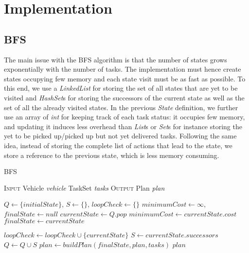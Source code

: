 \documentclass[10pt]{article}
\begin{document}
\section{Implementation}

\subsection{BFS}
The main issue with the BFS algorithm is that the number of states grows exponentially with the number of tasks.
The implementation must hence create states occupying few memory and each state visit must be as fast as possible.
To this end, we use a \textit{LinkedList} for storing the set of all states that are yet to be visited and \textit{HashSet}s for storing the successors of the current state as well as the set of all the already visited states.
In the previous \textit{State} definition, we further use an array of \textit{int} for keeping track of each task status: it occupies few memory, and updating it induces less overhead than \textit{List}s or \textit{Set}s for instance storing the yet to be picked up/picked up but not yet delivered tasks.
Following the same idea, instead of storing the complete list of actions that lead to the state, we store a reference to the previous state, which is less memory consuming.

\begin{algorithm}[t]
\caption{BFS}
\begin{algorithmic}[1]
\Statex \textsc{Input}
\Statex \hspace{\algorithmicindent} Vehicle \textit{vehicle} 
\Statex \hspace{\algorithmicindent} TaskSet \textit{tasks} 
\Statex \textsc{Output}
\Statex \hspace{\algorithmicindent} Plan \textit{plan} 

\Statex	  
\State $Q \gets \{initialState\}$, $S \gets \{\}$, $loopCheck \gets \{\}$
\State $minimumCost \gets \infty$, $finalState \gets null$ 
	\State $currentState \gets Q.pop$
			\State $minimumCost \gets currentState.cost$
			\State $finalState \gets currentState$
		\EndIf
	\EndIf
	
		\State $loopCheck \gets loopCheck \cup \{currentState\}$
		\State $S \gets currentState.successors$
		\State $Q \gets Q \cup S$
	\EndIf
\EndWhile
\Statex $plan \gets buildPlan(finalState, plan, tasks)$
\State \Return $plan$
\end{algorithmic}
\end{algorithm}
\end{document}

